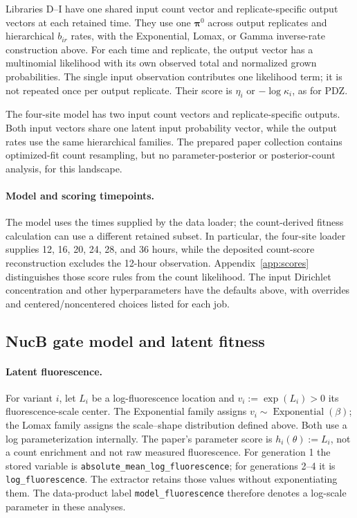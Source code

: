 Libraries D--I have one shared input count vector and replicate-specific
output vectors at each retained time. They use one
$\boldsymbol\pi^0$ across output replicates and hierarchical $b_{ir}$
rates, with the Exponential, Lomax, or Gamma inverse-rate construction
above. For each time and replicate, the output vector has a multinomial
likelihood with its own observed total and normalized grown probabilities.
The single input observation contributes one likelihood term; it is not
repeated once per output replicate. Their score is $\eta_i$ or
$-\log\kappa_i$, as for PDZ.

The four-site model has two input count vectors and replicate-specific
outputs. Both input vectors share one latent input probability vector, while
the output rates use the same hierarchical families. The prepared paper
collection contains optimized-fit count resampling, but no parameter-posterior
or posterior-count analysis, for this landscape.

\paragraph{Model and scoring timepoints.}
The model uses the times supplied by the data loader; the count-derived
fitness calculation can use a different retained subset. In particular,
the four-site loader supplies 12, 16, 20, 24, 28, and 36 hours, while the
deposited count-score reconstruction excludes the 12-hour observation.
Appendix~\ref{app:scores} distinguishes those score rules from the count
likelihood. The input Dirichlet concentration and other hyperparameters have
the defaults above, with overrides and centered/noncentered choices listed
for each job.

\subsection{NucB gate model and latent fitness}
\label{app:nuc-model}

\paragraph{Latent fluorescence.}
For variant $i$, let $L_i$ be a log-fluorescence location and
$v_i:=\exp(L_i)>0$ its fluorescence-scale center. The Exponential family
assigns $v_i\sim\operatorname{Exponential}(\beta)$; the Lomax family
assigns the scale--shape distribution defined above. Both use a log
parameterization internally. The paper's parameter score is
$h_i(\theta):=L_i$, not a count enrichment and not raw measured fluorescence.
For generation 1 the stored variable is
\texttt{absolute\_mean\_log\_fluorescence}; for generations 2--4 it is
\texttt{log\_fluorescence}. The extractor retains those values without
exponentiating them. The data-product label \texttt{model\_fluorescence}
therefore denotes a log-scale parameter in these analyses.

